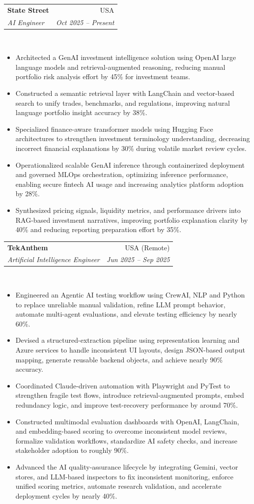 \documentclass[letterpaper,11pt]{article}
\newcommand{\resumeItem}[1]{\item\small{{#1 \vspace{-3pt}}}}
\newcommand{\resumeSubheading}[4]{
  \vspace{-3pt}\item
    \begin{tabularx}{0.995\textwidth}[t]{Xr}
      \textbf{#1} & #2 \\
      \textit{\small#3} & \textit{\small #4} \\
    \end{tabularx}\\[-3pt]
    \vspace{3pt}
}
\newcommand{\resumeItemListStart}{\begin{itemize}}
\newcommand{\resumeItemListEnd}{\end{itemize}\vspace{-4pt}}
\begin{document}
\resumeSubheading
{State Street}{USA}
{AI Engineer}{Oct 2025 – Present}

\resumeItemListStart
\resumeItem{Architected a GenAI investment intelligence solution using OpenAI large language models and retrieval-augmented reasoning, reducing manual portfolio risk analysis effort by 45\% for investment teams.}
\resumeItem{Constructed a semantic retrieval layer with LangChain and vector-based search to unify trades, benchmarks, and regulations, improving natural language portfolio insight accuracy by 38\%.}
\resumeItem{Specialized finance-aware transformer models using Hugging Face architectures to strengthen investment terminology understanding, decreasing incorrect financial explanations by 30\% during volatile market review cycles.}
\resumeItem{Operationalized scalable GenAI inference through containerized deployment and governed MLOps orchestration, optimizing inference performance, enabling secure fintech AI usage and increasing analytics platform adoption by 28\%.}
\resumeItem{Synthesized pricing signals, liquidity metrics, and performance drivers into RAG-based investment narratives, improving portfolio explanation clarity by 40\% and reducing reporting preparation effort by 35\%.}
\resumeItemListEnd

\resumeSubheading
{TekAnthem}{USA (Remote)}
{Artificial Intelligence Engineer}{Jun 2025 – Sep 2025}

\resumeItemListStart
\resumeItem{Engineered an Agentic AI testing workflow using CrewAI, NLP and Python to replace unreliable manual validation, refine LLM prompt behavior, automate multi-agent evaluations, and elevate testing efficiency by nearly 60\%.}
\resumeItem{Devised a structured-extraction pipeline using representation learning and Azure services to handle inconsistent UI layouts, design JSON-based output mapping, generate reusable backend objects, and achieve nearly 90\% accuracy.}
\resumeItem{Coordinated Claude-driven automation with Playwright and PyTest to strengthen fragile test flows, introduce retrieval-augmented prompts, embed redundancy logic, and improve test-recovery performance by around 70\%.}
\resumeItem{Constructed multimodal evaluation dashboards with OpenAI, LangChain, and embedding-based scoring to overcome inconsistent model reviews, formalize validation workflows, standardize AI safety checks, and increase stakeholder adoption to roughly 90\%.}
\resumeItem{Advanced the AI quality-assurance lifecycle by integrating Gemini, vector stores, and LLM-based inspectors to fix inconsistent monitoring, enforce unified scoring metrics, automate research validation, and accelerate deployment cycles by nearly 40\%.}
\resumeItemListEnd
\end{document}
